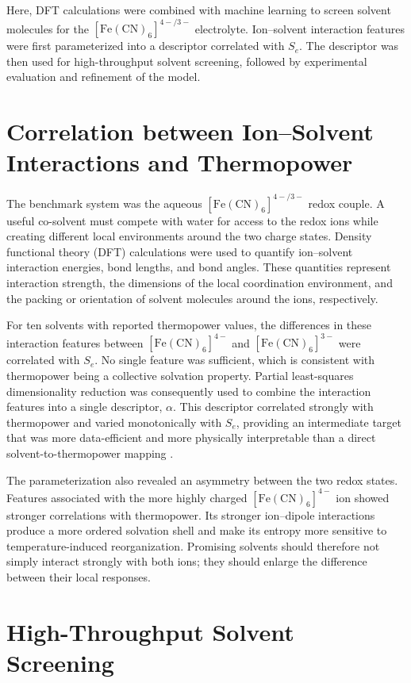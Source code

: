 \documentclass[a4paper,12pt]{report}
\begin{document}
Here, DFT calculations were combined with machine learning to screen solvent
molecules for the $[\mathrm{Fe(CN)}_6]^{4-/3-}$ electrolyte. Ion--solvent
interaction features were first parameterized into a descriptor correlated
with $S_e$. The descriptor was then used for high-throughput solvent screening,
followed by experimental evaluation and refinement of the model.

\section{Correlation between Ion--Solvent Interactions and Thermopower}

The benchmark system was the aqueous
$[\mathrm{Fe(CN)}_6]^{4-/3-}$ redox couple. A useful co-solvent must compete
with water for access to the redox ions while creating different local
environments around the two charge states. Density functional theory (DFT)
calculations were used to quantify ion--solvent interaction energies, bond
lengths, and bond angles. These quantities represent interaction strength, the
dimensions of the local coordination environment, and the packing or
orientation of solvent molecules around the ions, respectively.

For ten solvents with reported thermopower values, the differences in these
interaction features between $[\mathrm{Fe(CN)}_6]^{4-}$ and
$[\mathrm{Fe(CN)}_6]^{3-}$ were correlated with $S_e$. No single feature was
sufficient, which is consistent with thermopower being a collective solvation
property. Partial least-squares dimensionality reduction was consequently used
to combine the interaction features into a single descriptor, $\alpha$. This
descriptor correlated strongly with thermopower and varied monotonically with
$S_e$, providing an intermediate target that was more data-efficient and more
physically interpretable than a direct solvent-to-thermopower mapping
.

The parameterization also revealed an asymmetry between the two redox states.
Features associated with the more highly charged
$[\mathrm{Fe(CN)}_6]^{4-}$ ion showed stronger correlations with
thermopower. Its stronger ion--dipole interactions produce a more ordered
solvation shell and make its entropy more sensitive to temperature-induced
reorganization. Promising solvents should therefore not simply interact
strongly with both ions; they should enlarge the difference between their
local responses.

\section{High-Throughput Solvent Screening}
\end{document}
